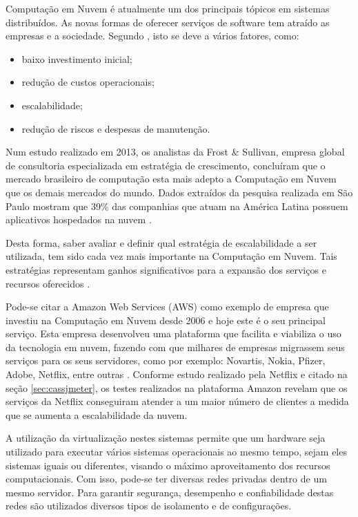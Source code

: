 Computação em Nuvem é atualmente um dos principais tópicos em sistemas distribuídos. As novas formas de oferecer serviços de software tem atraído as empresas e a sociedade. Segundo , isto se deve a vários fatores, como:

\begin{itemize}
    \item baixo investimento inicial;
    \item redução de custos operacionais;
    \item escalabilidade;
    \item redução de riscos e despesas de manutenção.
\end{itemize}

Num estudo realizado em 2013, os analistas da Frost \& Sullivan, empresa global de consultoria especializada em estratégia de crescimento, concluíram que o mercado brasileiro de computação esta mais adepto a Computação em Nuvem que os demais mercados do mundo. Dados extraídos da pesquisa realizada em São Paulo mostram que 39\% das companhias que atuam na América Latina possuem aplicativos hospedados na nuvem \cite{Silva2014}.

Desta forma, saber avaliar e definir qual estratégia de escalabilidade a ser utilizada, tem sido cada vez mais importante na Computação em Nuvem. Tais estratégias representam ganhos significativos para a expansão dos serviços e recursos oferecidos \cite{JISA2011}.

Pode-se citar a Amazon Web Services (AWS) como exemplo de empresa que investiu na Computação em Nuvem desde 2006 e hoje este é o seu principal serviço. Esta empresa desenvolveu uma plataforma que facilita e viabiliza o uso da tecnologia em nuvem, fazendo com que milhares de empresas migrassem seus serviços para os seus servidores, como por exemplo: Novartis, Nokia, Pfizer, Adobe, Netflix, entre outras \cite{AmazonWebServices2015}. Conforme estudo realizado pela Netflix e citado na seção \ref{sec:cassjmeter}, os testes realizados na plataforma Amazon revelam que os serviços da Netflix conseguiram atender a um maior número de clientes a medida que se aumenta a escalabilidade da nuvem. 

A utilização da virtualização nestes sistemas permite que um hardware seja utilizado para executar vários sistemas operacionais ao mesmo tempo, sejam eles sistemas iguais ou diferentes, visando o máximo aproveitamento dos recursos computacionais. Com isso, pode-se ter diversas redes privadas dentro de um mesmo servidor. Para garantir segurança, desempenho e confiabilidade destas redes são utilizados diversos tipos de isolamento e de configurações.

